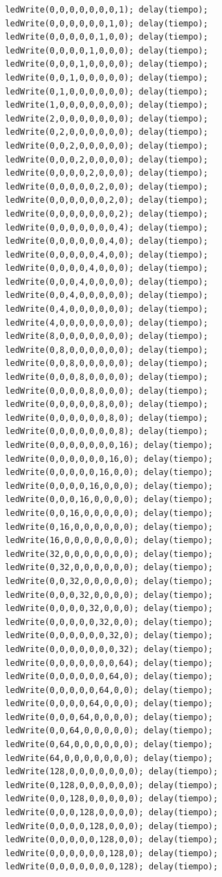 \documentclass{article}
\begin{document}
\begin{verbatim}
  ledWrite(0,0,0,0,0,0,0,1); delay(tiempo);
  ledWrite(0,0,0,0,0,0,1,0); delay(tiempo);
  ledWrite(0,0,0,0,0,1,0,0); delay(tiempo);
  ledWrite(0,0,0,0,1,0,0,0); delay(tiempo);
  ledWrite(0,0,0,1,0,0,0,0); delay(tiempo);
  ledWrite(0,0,1,0,0,0,0,0); delay(tiempo);
  ledWrite(0,1,0,0,0,0,0,0); delay(tiempo);
  ledWrite(1,0,0,0,0,0,0,0); delay(tiempo);
  ledWrite(2,0,0,0,0,0,0,0); delay(tiempo);
  ledWrite(0,2,0,0,0,0,0,0); delay(tiempo);
  ledWrite(0,0,2,0,0,0,0,0); delay(tiempo);
  ledWrite(0,0,0,2,0,0,0,0); delay(tiempo);
  ledWrite(0,0,0,0,2,0,0,0); delay(tiempo);
  ledWrite(0,0,0,0,0,2,0,0); delay(tiempo);
  ledWrite(0,0,0,0,0,0,2,0); delay(tiempo);
  ledWrite(0,0,0,0,0,0,0,2); delay(tiempo);
  ledWrite(0,0,0,0,0,0,0,4); delay(tiempo);
  ledWrite(0,0,0,0,0,0,4,0); delay(tiempo);
  ledWrite(0,0,0,0,0,4,0,0); delay(tiempo);
  ledWrite(0,0,0,0,4,0,0,0); delay(tiempo);
  ledWrite(0,0,0,4,0,0,0,0); delay(tiempo);
  ledWrite(0,0,4,0,0,0,0,0); delay(tiempo);
  ledWrite(0,4,0,0,0,0,0,0); delay(tiempo);
  ledWrite(4,0,0,0,0,0,0,0); delay(tiempo);
  ledWrite(8,0,0,0,0,0,0,0); delay(tiempo);
  ledWrite(0,8,0,0,0,0,0,0); delay(tiempo);
  ledWrite(0,0,8,0,0,0,0,0); delay(tiempo);
  ledWrite(0,0,0,8,0,0,0,0); delay(tiempo);
  ledWrite(0,0,0,0,8,0,0,0); delay(tiempo);
  ledWrite(0,0,0,0,0,8,0,0); delay(tiempo);
  ledWrite(0,0,0,0,0,0,8,0); delay(tiempo);
  ledWrite(0,0,0,0,0,0,0,8); delay(tiempo);
  ledWrite(0,0,0,0,0,0,0,16); delay(tiempo);
  ledWrite(0,0,0,0,0,0,16,0); delay(tiempo);
  ledWrite(0,0,0,0,0,16,0,0); delay(tiempo);
  ledWrite(0,0,0,0,16,0,0,0); delay(tiempo);
  ledWrite(0,0,0,16,0,0,0,0); delay(tiempo);
  ledWrite(0,0,16,0,0,0,0,0); delay(tiempo);
  ledWrite(0,16,0,0,0,0,0,0); delay(tiempo);
  ledWrite(16,0,0,0,0,0,0,0); delay(tiempo);
  ledWrite(32,0,0,0,0,0,0,0); delay(tiempo);
  ledWrite(0,32,0,0,0,0,0,0); delay(tiempo);
  ledWrite(0,0,32,0,0,0,0,0); delay(tiempo);
  ledWrite(0,0,0,32,0,0,0,0); delay(tiempo);
  ledWrite(0,0,0,0,32,0,0,0); delay(tiempo);
  ledWrite(0,0,0,0,0,32,0,0); delay(tiempo);
  ledWrite(0,0,0,0,0,0,32,0); delay(tiempo);
  ledWrite(0,0,0,0,0,0,0,32); delay(tiempo);
  ledWrite(0,0,0,0,0,0,0,64); delay(tiempo);
  ledWrite(0,0,0,0,0,0,64,0); delay(tiempo);
  ledWrite(0,0,0,0,0,64,0,0); delay(tiempo);
  ledWrite(0,0,0,0,64,0,0,0); delay(tiempo);
  ledWrite(0,0,0,64,0,0,0,0); delay(tiempo);
  ledWrite(0,0,64,0,0,0,0,0); delay(tiempo);
  ledWrite(0,64,0,0,0,0,0,0); delay(tiempo);
  ledWrite(64,0,0,0,0,0,0,0); delay(tiempo);
  ledWrite(128,0,0,0,0,0,0,0); delay(tiempo);
  ledWrite(0,128,0,0,0,0,0,0); delay(tiempo);
  ledWrite(0,0,128,0,0,0,0,0); delay(tiempo);
  ledWrite(0,0,0,128,0,0,0,0); delay(tiempo);
  ledWrite(0,0,0,0,128,0,0,0); delay(tiempo);
  ledWrite(0,0,0,0,0,128,0,0); delay(tiempo);
  ledWrite(0,0,0,0,0,0,128,0); delay(tiempo);
  ledWrite(0,0,0,0,0,0,0,128); delay(tiempo);
  

\end{verbatim}
\end{document}
